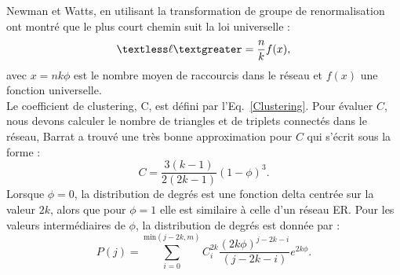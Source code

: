  Newman et Watts, en utilisant la transformation de groupe de renormalisation ont montré que le plus court chemin suit la loi universelle \cite{Newman-Watts1999-2}:
 \begin{equation}
 \textless\ell\textgreater= \frac{n}{k}f(x),
 \label{fc_univ}
 \end{equation}
 avec $x=nk\phi$ est le nombre moyen de raccourcis dans le réseau et $f(x)$ une fonction universelle.\\ 
 Le coefficient de clustering, C, est défini par l'Eq.~\eqref{Clustering}. 
 Pour évaluer $C$, nous devons calculer le nombre de triangles et de triplets connectés dans le réseau, Barrat a trouvé une très bonne approximation pour $C$ qui s'écrit sous la forme \cite{Barrat-Weigt2000}:
 \begin{equation}
 C=\frac{3(k-1)}{2(2k-1)}(1-\phi)^3.
 \end{equation}  
 Lorsque $\phi=0$, la distribution de degrés est une fonction delta centrée sur la valeur $2k$, alors que pour $\phi=1$ elle est similaire à celle d'un réseau ER. Pour les valeurs intermédiaires de $\phi$, la distribution de degrés est donnée par \cite{Barrat-Weigt2000}:
 \begin{equation}
 P(j)=\sum_{i=0}^{\text{min}(j-2k,m)}C_i^{2k}\frac{(2k\phi)^{j-2k-i}}{(j-2k-i)}e^{2k\phi}.
 \end{equation} 
 

